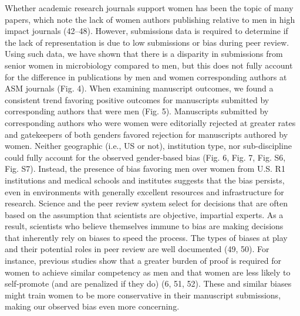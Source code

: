 \documentclass[11pt,]{article}
\begin{document}
Whether academic research journals support women has been the topic of
many papers, which note the lack of women authors publishing relative to
men in high impact journals (42--48). However, submissions data is
required to determine if the lack of representation is due to low
submissions or bias during peer review. Using such data, we have shown
that there is a disparity in submissions from senior women in
microbiology compared to men, but this does not fully account for the
difference in publications by men and women corresponding authors at ASM
journals (Fig. 4). When examining manuscript outcomes, we found a
consistent trend favoring positive outcomes for manuscripts submitted by
corresponding authors that were men (Fig. 5). Manuscripts submitted by
corresponding authors who were women were editorially rejected at
greater rates and gatekeepers of both genders favored rejection for
manuscripts authored by women. Neither geographic (i.e., US or not),
institution type, nor sub-discipline could fully account for the
observed gender-based bias (Fig. 6, Fig. 7, Fig. S6, Fig. S7). Instead,
the presence of bias favoring men over women from U.S. R1 institutions
and medical schools and institutes suggests that the bias persists, even
in environments with generally excellent resources and infrastructure
for research. Science and the peer review system select for decisions
that are often based on the assumption that scientists are objective,
impartial experts. As a result, scientists who believe themselves immune
to bias are making decisions that inherently rely on biases to speed the
process. The types of biases at play and their potential roles in peer
review are well documented (49, 50). For instance, previous studies show
that a greater burden of proof is required for women to achieve similar
competency as men and that women are less likely to self-promote (and
are penalized if they do) (6, 51, 52). These and similar biases might
train women to be more conservative in their manuscript submissions,
making our observed bias even more concerning.
\end{document}
